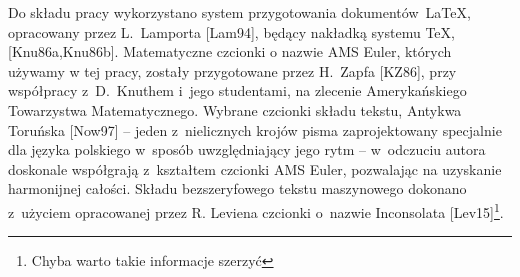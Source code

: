 
\mbox{}\vfill\hfill
\begin{minipage}{0.5\linewidth} 
  {\tiny \noindent Do składu pracy wykorzystano system przygotowania
    dokumentów~\LaTeX, opracowany przez
    L.~Lamporta [Lam94], będący nakładką
    systemu \TeX, [Knu86a,Knu86b].  Matematyczne czcionki o nazwie
    {AMS Euler}, których używamy w tej pracy, zostały przygotowane
    przez H.\ Zapfa [KZ86], przy współpracy z~D.\ Knuthem i~jego
    studentami, na zlecenie Amerykańskiego Towarzystwa Matematycznego.
    Wybrane czcionki składu tekstu, Antykwa Toruńska [Now97] -- jeden
    z~nielicznych krojów pisma zaprojektowany specjalnie dla języka
    polskiego w~sposób uwzględniający jego rytm -- w~odczuciu autora
    doskonale współgrają z~kształtem czcionki {AMS Euler}, pozwalając
    na uzyskanie harmonijnej całości.
    Składu bezszeryfowego tekstu maszynowego dokonano z~użyciem
    opracowanej przez R. Leviena czcionki o~nazwie Inconsolata
    [Lev15]\footnote{\red\tiny Chyba warto takie informacje szerzyć}.


\vspace{-4mm}

 \makeatletter
\renewenvironment{thebibliography}[1]
     {%
        \tiny%
      \list{\@biblabel{\@arabic\c@enumiv}}%
           {\settowidth\labelwidth{\@biblabel{#1}}%
\setlength{\itemsep}{2.5mm}
            \leftmargin\labelwidth
            \advance\leftmargin\labelsep
            \@openbib@code
            \usecounter{enumiv}%
            \let\p@enumiv\@empty
            \renewcommand\theenumiv{\@arabic\c@enumiv}}%
      \sloppy\clubpenalty4000\widowpenalty4000%
      \sfcode`\.\@m\vspace{5mm}}
     {\def\@noitemerr
       {\@latex@warning{Empty `thebibliography' environment}}%
      \endlist}

}
\end{minipage}
